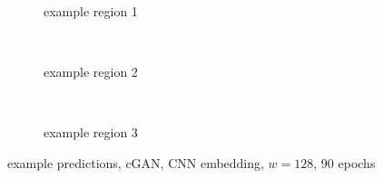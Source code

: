 \begin{figure}[p] %
    \begin{subfigure}{\textwidth}
        \centering
        \caption{example  region 1} \label{fig:results:cGAN128_r1}
    \end{subfigure}\\[3mm]
    \begin{subfigure}{\textwidth}
        \centering
        \caption{example region 2} \label{fig:results:cGAN128_r2}
    \end{subfigure}\\[3mm]
    \begin{subfigure}{\textwidth}
        \centering
        \caption{example region 3} \label{fig:results:cGAN128_r3}
    \end{subfigure}
    \caption{example predictions, cGAN, CNN embedding, $w=128$, 90 epochs} \label{fig:results:cGAN128_matrices}
\end{figure}

